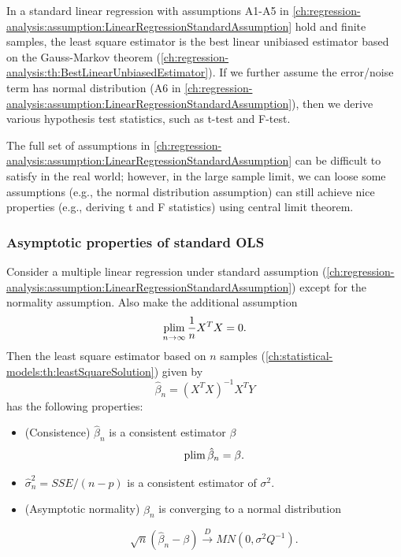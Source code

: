 \begin{refsection}
\begin{remark}[Motivation]
In a standard linear regression with assumptions A1-A5 in \autoref{ch:regression-analysis:assumption:LinearRegressionStandardAssumption} hold and finite samples, the least square estimator is the best linear unibiased estimator based on the Gauss-Markov theorem (\autoref{ch:regression-analysis:th:BestLinearUnbiasedEstimator}). If we further assume the error/noise term has normal distribution (A6 in \autoref{ch:regression-analysis:assumption:LinearRegressionStandardAssumption}), then we derive various hypothesis test statistics, such as t-test and F-test. 

The full set of assumptions in \autoref{ch:regression-analysis:assumption:LinearRegressionStandardAssumption} can be difficult to satisfy in the real world; however, in the large sample limit, we can loose some assumptions (e.g., the normal distribution assumption) can still achieve nice properties (e.g., deriving t and F statistics) using central limit theorem.
\end{remark}


\subsubsection{Asymptotic properties of standard OLS}


\begin{theorem}\cite[64]{greene2017econometric}
Consider a multiple linear regression under standard assumption (\autoref{ch:regression-analysis:assumption:LinearRegressionStandardAssumption}) except for the normality assumption. Also make the additional assumption
$$\operatorname*{plim}_{n\to \infty} \frac{1}{n}X^TX = 0.$$
Then the least square estimator based on $n$ samples (\autoref{ch:statistical-models:th:leastSquareSolution}) given by
$$\hat{\beta}_n = (X^TX)^{-1}X^TY$$
has the following properties:
\begin{itemize}

	\item (Consistence) $\hat{\beta}_n$ is a consistent estimator $\beta$
	$$\operatorname*{plim} \hat{\beta}_n = \beta.$$
	\item $\hat{\sigma}^2_n = SSE/(n-p)$ is a consistent estimator of $\sigma^2$.
	\item (Asymptotic normality) $\hat{\beta}_n$ is converging to a normal distribution
	
	$$\sqrt{n}(\hat{\beta}_n - \beta) \xrightarrow[ ]{D} MN(0, \sigma^2Q^{-1}). $$


\end{itemize}
\end{theorem}
\end{refsection}
